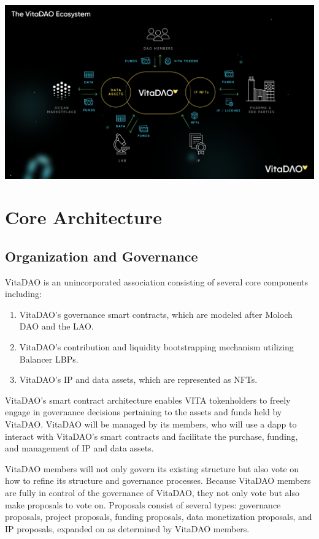 \documentclass[12pt,letterpaper]{article}
\begin{document}
\vspace{15pt}
\begin{center}
\includegraphics[width=\linewidth]{images/VitaDAO Diagram - Ecosystem-p-1600.png} 
\end{center}
\section{Core Architecture}

\subsection{Organization and Governance}
VitaDAO is an unincorporated association consisting of several core components including:
\begin{enumerate}
\item VitaDAO’s governance smart contracts, which are modeled after Moloch DAO and the LAO.
\item VitaDAO’s contribution and liquidity bootstrapping mechanism utilizing Balancer LBPs.
\item VitaDAO’s IP and data assets, which are represented as NFTs.
\end{enumerate}
VitaDAO’s smart contract architecture enables VITA tokenholders to freely engage in governance decisions pertaining to the assets and funds held by VitaDAO. VitaDAO will be managed by its members, who will use a dapp to interact with VitaDAO’s smart contracts and facilitate the purchase, funding, and management of IP and data assets.

VitaDAO members will not only govern its existing structure but also vote on how to refine its structure and governance processes. Because VitaDAO members are fully in control of the governance of VitaDAO, they not only vote but also make proposals to vote on. Proposals consist of several types: governance proposals, project proposals, funding proposals, data monetization proposals, and IP proposals, expanded on as determined by VitaDAO members.
\end{document}
